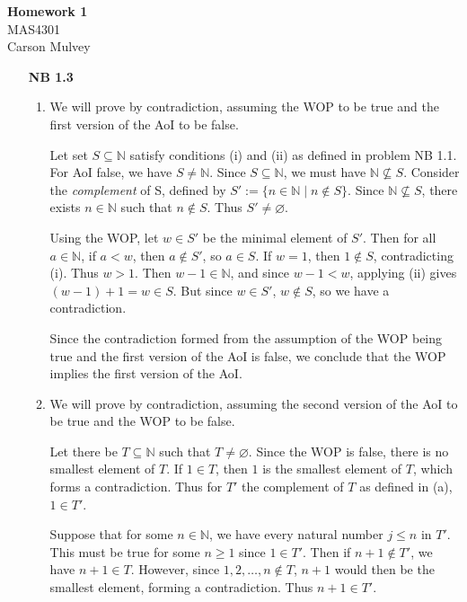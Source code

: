 \documentclass[11pt,letterpaper]{article}
\newcommand{\N}{\mathbb{N}}
\begin{document}
\begin{center}
    \begin{large}
        \textbf{Homework 1} \\
        MAS4301 \\
        Carson Mulvey
    \end{large}
\end{center}

\begin{enumerate}
\item[\textbf{NB 1.3}]
    \begin{enumerate}
        \item We will prove by contradiction, assuming the WOP to be true and the first version of the AoI to be false.
        
        Let set $S\subseteq{\mathbb{N}}$ satisfy conditions (i) and (ii) as defined in problem NB 1.1. For AoI false, we have $S\neq{\mathbb{N}}$. Since $S\subseteq{\mathbb{N}}$, we must have $\mathbb{N}\nsubseteq{S}$. Consider the \textit{complement} of S, defined by $S':=\{n\in{\mathbb{N}}\mid{}n\notin{S}\}$. Since $\mathbb{N}\nsubseteq{S}$, there exists $n\in{\mathbb{N}}$ such that $n\notin{S}$. Thus $S'\neq{\varnothing}$.
        
        Using the WOP, let $w\in{S'}$ be the minimal element of $S'$. Then for all $a\in{\N}$, if $a<w$, then $a\notin{S'}$, so $a\in{S}$. If $w=1$, then $1\notin{S}$, contradicting (i). Thus $w>1$. Then $w-1\in{\N}$, and since $w-1<w$, applying (ii) gives $(w-1)+1=w\in{S}$. But since $w\in{S'}$, $w\notin{S}$, so we have a contradiction.
        
        Since the contradiction formed from the assumption of the WOP being true and the first version of the AoI is false, we conclude that the WOP implies the first version of the AoI. \qedsymbol{}
        \item We will prove by contradiction, assuming the second version of the AoI to be true and the WOP to be false.
    
        Let there be $T\subseteq{\N}$ such that $T\neq{\varnothing}$. Since the WOP is false, there is no smallest element of $T$. If $1\in{T}$, then $1$ is the smallest element of $T$, which forms a contradiction. Thus for $T'$ the complement of $T$ as defined in (a), $1\in{T'}$. 

        Suppose that for some $n\in{\N}$, we have every natural number $j\leq{n}$ in ${T'}$. This must be true for some $n\geq{1}$ since $1\in{T'}$. Then if $n+1\notin{T'}$, we have $n+1\in{T}$. However, since $1,2,\dots,n\notin{T}$, $n+1$ would then be the smallest element, forming a contradiction. Thus $n+1\in{T'}$.


\end{enumerate}
\end{enumerate}
\end{document}
